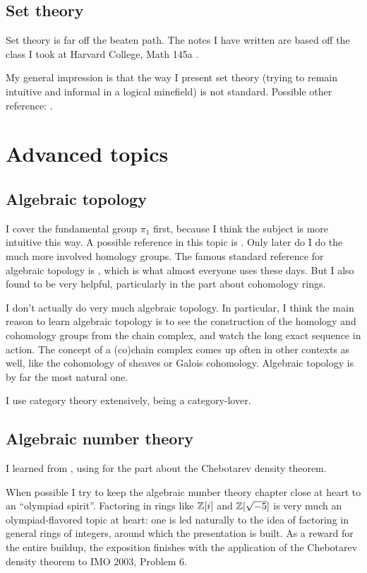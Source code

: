 \subsection{Set theory}
Set theory is far off the beaten path.
The notes I have written are based off the class
I took at Harvard College, Math 145a \cite{ref:145a}.

My general impression is that the way I present set theory
(trying to remain intuitive and informal in a logical minefield)
is not standard. Possible other reference: \cite{ref:miquel}.

\section{Advanced topics}
\subsection{Algebraic topology}
I cover the fundamental group $\pi_1$ first, because I think the subject is more
intuitive this way. A possible reference in this topic is \cite{ref:munkres}.
Only later do I do the much more involved homology groups.
The famous standard reference for algebraic topology is \cite{ref:hatcher},
which is what almost everyone uses these days.
But I also found \cite{ref:maxim752} to be very helpful,
particularly in the part about cohomology rings.

I don't actually do very much algebraic topology.
In particular, I think the main reason to learn algebraic topology
is to see the construction of the homology and cohomology groups
from the chain complex, and watch the long exact sequence in action.
The concept of a (co)chain complex comes up often in other contexts as well,
like the cohomology of sheaves or Galois cohomology.
Algebraic topology is by far the most natural one.

I use category theory extensively, being a category-lover.

\subsection{Algebraic number theory}
I learned from \cite{ref:oggier_NT},
using \cite{ref:lenstra_chebotarev}
for the part about the Chebotarev density theorem.

When possible I try to keep the algebraic number theory chapter close at
heart to an ``olympiad spirit''.
Factoring in rings like $\mathbb Z[i]$ and $\mathbb Z[\sqrt{-5}]$
is very much an olympiad-flavored topic at heart:
one is led naturally to the idea of factoring in general rings of integers,
around which the presentation is built.
As a reward for the entire buildup, the exposition finishes
with the application of the Chebotarev density theorem to IMO 2003, Problem 6.

